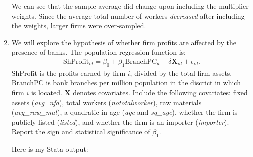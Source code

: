 \documentclass[11pt,twoside,openany]{memoir}
\begin{document}
\begin{question}
\begin{enumerate}[label = (\alph*),itemsep=1pt,topsep=3pt]
{\begin{solution}
\begin{Verbatim}[fontsize=\footnotesize]
                    \end{Verbatim}
                We can see that the sample average did change upon including the multiplier weights. Since the average total number of workers \textit{decreased} after including the weights, larger firms were over-sampled.
            \end{solution}}
        \item We will explore the hypothesis of whether firm profits are affected by the presence of banks. The population regression function is:
            \begin{equation*}
            \begin{split}
                \text{ShProfit}_{id} = \beta_0 + \beta_1 \text{BranchPC}_d + \delta \mathbf{X}_{id} + \epsilon_{id}.
            \end{split}
            \end{equation*}
        $\text{ShProfit}$ is the profits earned by firm $i$, divided by the total firm assets. $\text{BranchPC}$ is bank branches per million population in the discrict in which firm $i$ is located. $\mathbf{X}$ denotes covariates. Include the following covariates: fixed assets (\textit{avg\_nfa}), total workers (\textit{nototalworker}), raw materials (\textit{avg\_raw\_mat}), a quadratic in age (\textit{age} and \textit{sq\_age}), whether the firm is publicly listed (\textit{listed}), and whether the firm is an importer (\textit{importer}). Report the sign and statistical significance of $\beta_1$.
            \newpage
            {\color{blue} \begin{solution}
                Here is my Stata output:
                    \begin{Verbatim}[fontsize=\footnotesize]
                        

\end{Verbatim}
\end{solution}}
\end{enumerate}
\end{question}
\end{document}
